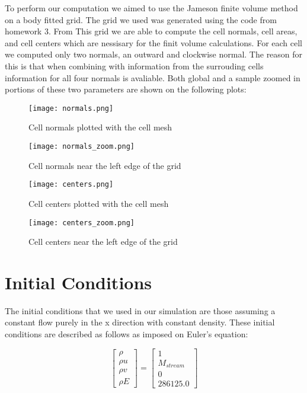\documentclass[a4paper,12pt,titlepage]{article}
\newcommand{\scale}{0.5}
\begin{document}
  To perform our computation we aimed to use the Jameson finite volume method on a body fitted grid.  The grid we used was generated using the code from homework 3.  From This grid we are able to compute the cell normals, cell areas, and cell centers which are nessisary for the finit volume calculations.  For each cell we computed only two normals, an outward and clockwise normal.  The reason for this is that when combining with information from the surrouding cells information for all four normals is avaliable.  Both global and a sample zoomed in portions of these two parameters are shown on the following plots:

\begin{figure}[H]
  \begin{center}
    \texttt{[image: normals.png]}
    \caption{Cell normals plotted with the cell mesh}
  \end{center}
\end{figure}

\begin{figure}[H]
  \begin{center}
    \texttt{[image: normals\_zoom.png]}
    \caption{Cell normals near the left edge of the grid}
  \end{center}
\end{figure}


\begin{figure}[H]
  \begin{center}
    \texttt{[image: centers.png]}
    \caption{Cell centers plotted with the cell mesh}
  \end{center}
\end{figure}

\begin{figure}[H]
  \begin{center}
    \texttt{[image: centers\_zoom.png]}
    \caption{Cell centers near the left edge of the grid}
  \end{center}
\end{figure}


\section{Initial Conditions}
The initial conditions that we used in our simulation are those assuming a constant flow purely in the x direction with constant density.  These initial conditions are described as follows as imposed on Euler's equation:

\begin{equation}
\begin{bmatrix}
\rho \\ \rho u \\ \rho v \\ \rho E
\end{bmatrix}
=
\begin{bmatrix}
1 \\ M_{stream} \\ 0 \\ 286125.0
\end{bmatrix}
\end{equation}
\end{document}
